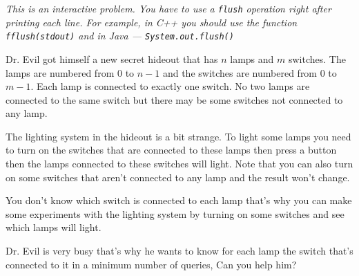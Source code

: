\textit{This is an interactive problem. You have to use a \texttt{flush} operation right after printing each line. For example, in C++ you should use the function \texttt{fflush(stdout)} and in Java --- \texttt{System.out.flush()}}

Dr. Evil got himself a new secret hideout that has $n$ lamps and $m$ switches. The lamps are numbered from $0$ to $n-1$ and the switches are numbered from $0$ to $m-1$. Each lamp is connected to exactly one switch. No two lamps are connected to the same switch but there may be some switches not connected to any lamp.

The lighting system in the hideout is a bit strange. To light some lamps you need to turn on the switches that are connected to these lamps then press a button then the lamps connected to these switches will light. Note that you can also turn on some switches that aren't connected to any lamp and the result won't change.

You don't know which switch is connected to each lamp that's why you can make some experiments with the lighting system by turning on some switches and see which lamps will light. 

Dr. Evil is very busy that's why he wants to know for each lamp the switch that's connected to it in a minimum number of queries, Can you help him?